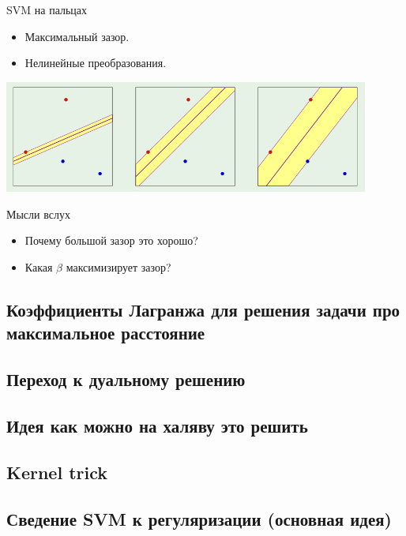 \documentclass[14pt, fleqn, xcolor={dvipsnames, table}]{beamer}
\begin{document}
\begin{frame}{SVM на пальцах}
\begin{itemize}
  \item Максимальный зазор.
  \item Нелинейные преобразования.
\end{itemize}
\begin{center}
\includegraphics[width=0.9\textwidth]{SVM_1.png}
\end{center}
\end{frame}

\begin{frame}{Мысли вслух}
\begin{itemize}
  \item Почему большой зазор это хорошо?
  \item Какая $\beta$ максимизирует зазор? 
\end{itemize}
\end{frame}

\subsection{Коэффициенты Лагранжа для решения задачи про максимальное расстояние}
\subsection{Переход к дуальному решению}
\subsection{Идея как можно на халяву это решить}
\subsection{Kernel trick}
\subsection{Сведение SVM к регуляризации (основная идея)}
\end{document}
